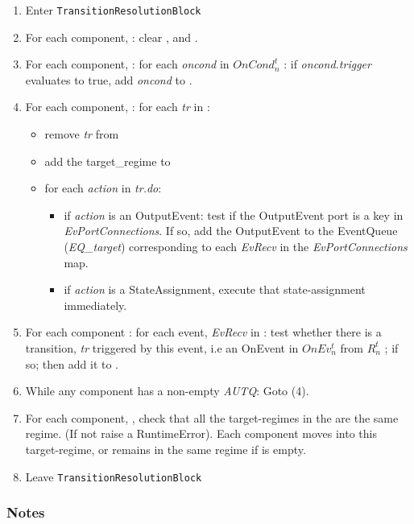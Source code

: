 \documentclass{article}
\begin{document}
\begin{enumerate}
\item Enter {\tt TransitionResolutionBlock}
\item For each component, \CN: clear \RCLn, \AUTQn and \EQn.
\item For each component, \CN: for each \textsl{oncond} in $OnCond^{t}_{n}$ : if
\textsl{oncond.trigger} evaluates to true, add \textsl{oncond} to \AUTQn.
\item For each component, \CN:  for each \textsl{tr} in \AUTQn :
\begin{itemize}
\item
remove \textsl{tr} from \AUTQn
\item add the target\_regime to \RCLn
\item for each
\textsl{action} in \textsl{tr.do}:
\begin{itemize}
\item if \textsl{action} is an OutputEvent: test
if the OutputEvent port is a key in \textsl{EvPortConnections}. If so, add the
    OutputEvent to the EventQueue (\textsl{EQ\_{target}}) corresponding to each
    \textsl{EvRecv} in the \textsl{EvPortConnections} map.

\item  if \textsl{action}  is a StateAssignment, execute that state-assignment
immediately.
\end{itemize}
\end{itemize}

\item For each component \CN: for each event, \textsl{EvRecv} in \EQn: test
whether there is a transition, \textsl{tr} triggered by this event, i.e an
OnEvent in $OnEv^t_n$ from $R^t_n$ ; if so; then add it to \AUTQn.

\item While any component has a non-empty \textsl{AUTQ}: Goto (4).

\item For each component, \CN, check that all the target-regimes in the \RCLn
are the same regime. (If not raise a RuntimeError). Each component moves into
this target-regime, or remains in the same regime if \RCLn is empty.

\item Leave {\tt TransitionResolutionBlock}

\end{enumerate}

\subsubsection{Notes}
\end{document}
